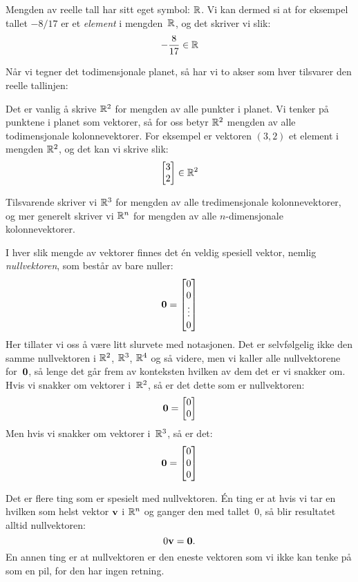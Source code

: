 Mengden av reelle tall har sitt eget symbol: $\mathbb{R}$.  Vi kan dermed si
at for eksempel tallet $-8/17$ er et \emph{element} i mengden~$\mathbb{R}$, og
det skriver vi slik:
\[
-\frac{8}{17} \in \mathbb{R}
\]

Når vi tegner det todimensjonale planet, så har vi to akser som hver
tilsvarer den reelle tallinjen:
\begin{center}
\end{center}
Det er vanlig å skrive $\mathbb{R}^2$ for mengden av alle punkter i planet.
Vi tenker på punktene i planet som vektorer, så for oss betyr $\mathbb{R}^2$
mengden av alle todimensjonale kolonnevektorer.  For eksempel er
vektoren $(3,2)$ et element i mengden $\mathbb{R}^2$, og det kan vi skrive
slik:
\[
\begin{bmatrix} 3 \\ 2 \end{bmatrix} \in \mathbb{R}^2
\]

Tilsvarende skriver vi $\mathbb{R}^3$ for mengden av alle tredimensjonale
kolonnevektorer, og mer generelt skriver vi $\mathbb{R}^n$ for mengden av alle
$n$-dimensjonale kolonnevektorer.

\smallskip
I hver slik mengde av vektorer finnes det én veldig spesiell vektor,
nemlig \emph{nullvektoren}, som består av bare nuller:
\[
\mathbf{0} = \begin{bmatrix} 0 \\ 0 \\ \vdots \\ 0 \end{bmatrix}
\]
Her tillater vi oss å være litt slurvete med notasjonen.  Det er
selvfølgelig ikke den samme nullvektoren i $\mathbb{R}^2$, $\mathbb{R}^3$, $\mathbb{R}^4$ og
så videre, men vi kaller alle nullvektorene for~$\mathbf{0}$, så lenge det går
frem av konteksten hvilken av dem det er vi snakker om.
Hvis vi snakker om vektorer i~$\mathbb{R}^2$, så er det dette som er
nullvektoren:
\[
\mathbf{0} = \begin{bmatrix} 0 \\ 0 \end{bmatrix}
\]
Men hvis vi snakker om vektorer i~$\mathbb{R}^3$, så er det:
\[
\mathbf{0} = \begin{bmatrix} 0 \\ 0 \\ 0 \end{bmatrix}
\]

Det er flere ting som er spesielt med nullvektoren.  Én ting er at
hvis vi tar en hvilken som helst vektor $\mathbf{v}$ i $\mathbb{R}^n$ og ganger den
med tallet~$0$, så blir resultatet alltid nullvektoren:
\[
0 \mathbf{v} = \mathbf{0}.
\]
En annen ting er at nullvektoren er den eneste vektoren som vi ikke
kan tenke på som en pil, for den har ingen retning.



\kapittelslutt
